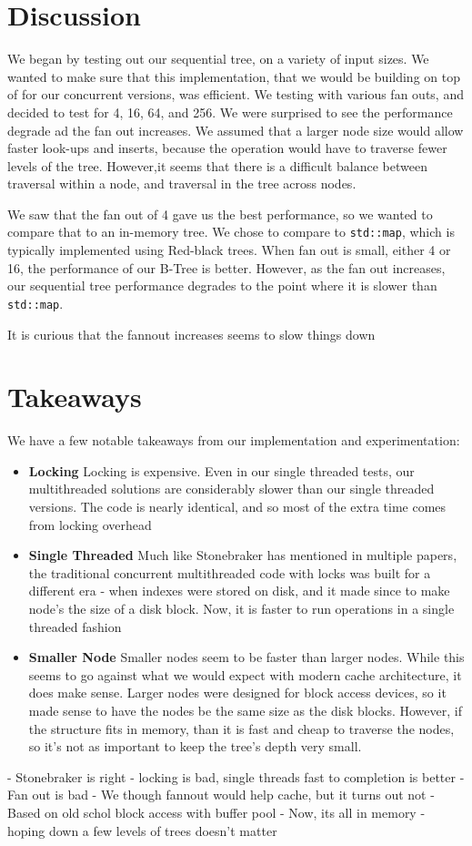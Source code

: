 \documentclass{sig-alternate}
\begin{document}
\section{Discussion}
We began by testing out our sequential tree, on a variety of input sizes.  We wanted to make sure that this implementation, that we would be building on top of for our concurrent versions, was efficient.  We testing with various fan outs, and decided to test for 4, 16, 64, and 256.  We were surprised to see the performance degrade ad the fan out increases.  We assumed that a larger node size would allow faster look-ups and inserts, because the operation would have to traverse fewer levels of the tree.  However,it seems that there is a difficult balance between traversal within a node, and traversal in the tree across nodes.

We saw that the fan out of 4 gave us the best performance, so we wanted to compare that to an in-memory tree.  We chose to compare to \texttt{std::map}, which is typically implemented using Red-black trees.  When fan out is small, either 4 or 16, the performance of our B-Tree is better.  However, as the fan out increases, our sequential tree performance degrades to the point where it is slower than \texttt{std::map}.

It is curious that the fannout increases seems to slow things down

\section{Takeaways}
We have a few notable takeaways from our implementation and experimentation:
\begin{itemize}
\item \textbf{Locking} Locking is expensive.  Even in our single threaded tests, our multithreaded solutions are considerably slower than our single threaded versions.  The code is nearly identical, and so most of the extra time comes from locking overhead
\item \textbf{Single Threaded} Much like Stonebraker has mentioned in multiple papers, the traditional concurrent multithreaded code with locks was built for a different era - when indexes were stored on disk, and it made since to make node's the size of a disk block.  Now, it is faster to run operations in a single threaded fashion
\item \textbf{Smaller Node} Smaller nodes seem to be faster than larger nodes.  While this seems to go against what we would expect with modern cache architecture, it does make sense.  Larger nodes were designed for block access devices, so it made sense to have the nodes be the same size as the disk blocks.  However, if the structure fits in memory, than it is fast and cheap to traverse the nodes, so it's not as important to keep the tree's depth very small.
\end{itemize}
- Stonebraker is right - locking is bad, single threads fast to completion is better
- Fan out is bad
	- We though fannout would help cache, but it turns out not
	- Based on old schol block access with buffer pool
	- Now, its all in memory - hoping down a few levels of trees doesn't matter
\end{document}
